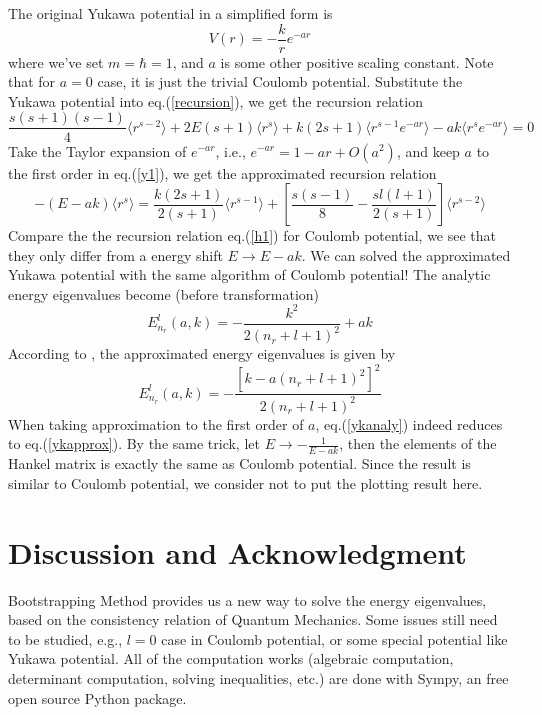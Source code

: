 \documentclass[10pt]{article}
\begin{document}
The original Yukawa potential in a simplified form is
\begin{equation}
    V(r)=-\frac{k}{r}e^{-ar}
\end{equation}
where we've set $m=\hbar=1$, and $a$ is some other positive scaling constant. Note that for $a=0$ case, it is just the trivial Coulomb potential. Substitute the Yukawa potential into eq.(\ref{recursion}), we get the recursion relation
\begin{equation}\label{y1}
    \frac{s(s+1)(s-1)}{4}\langle r^{s-2}\rangle + 2E(s+1)\langle r^s\rangle + k(2s+1)\langle r^{s-1}e^{-ar}\rangle - ak\langle r^s e^{-ar}\rangle=0
\end{equation}
Take the Taylor expansion of $e^{-ar}$, i.e., $e^{-ar}=1-ar+O(a^2)$, and keep $a$ to the first order in eq.(\ref{y1}), we get the approximated recursion relation
\begin{equation}
    -(E-ak)\langle r^s\rangle = 
    \frac{k(2s+1)}{2(s+1)}\langle r^{s-1}\rangle
    +[\frac{s(s-1)}{8}-\frac{sl(l+1)}{2(s+1)}]\langle r^{s-2}\rangle
\end{equation}
Compare the the recursion relation eq.(\ref{h1}) for Coulomb potential, we see that they only differ from a energy shift $E\rightarrow E-ak$. We can solved the approximated Yukawa potential with the same algorithm of Coulomb potential! The analytic energy eigenvalues become (before transformation)
\begin{equation}\label{ykapprox}
    E^l_{n_r}(a,k)=-\frac{k^2}{2(n_r+l+1)^2}+ak
\end{equation}
According to \cite{approxyukawa}, the approximated energy eigenvalues is given by
\begin{equation}\label{ykanaly}
    E^l_{n_r}(a,k)=-\frac{[k-a(n_r+l+1)^2]^2}{2(n_r+l+1)^2}
\end{equation}
When taking approximation to the first order of $a$, eq.(\ref{ykanaly}) indeed reduces to eq.(\ref{ykapprox}). By the same trick, let $E\rightarrow -\frac{1}{E-ak}$, then the elements of the Hankel matrix is exactly the same as Coulomb potential. Since the result is similar to Coulomb potential, we consider not to put the plotting result here.

\section{Discussion and Acknowledgment }\label{sec:5}
Bootstrapping Method provides us a new way to solve the energy eigenvalues, based on the consistency relation of Quantum Mechanics. Some issues still need to be studied, e.g., $l=0$ case in Coulomb potential, or some special potential like Yukawa potential. All of the computation works (algebraic computation, determinant computation, solving inequalities, etc.) are done with Sympy\cite{sympy}, an free open source Python package.

\newpage

\end{document}
